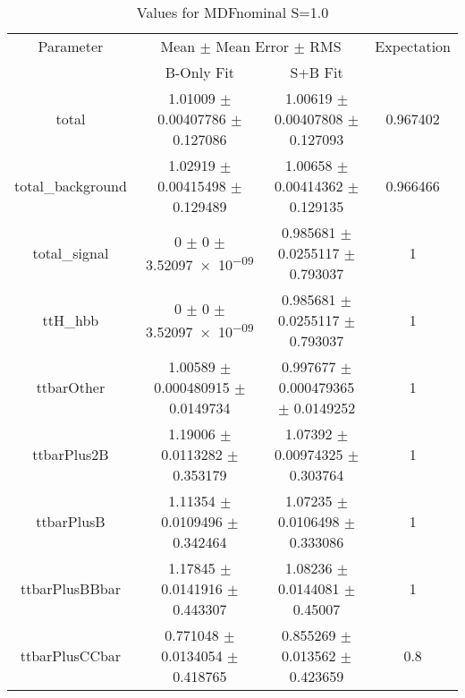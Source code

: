 \begin{table}
\centering
\caption{Values for MDFnominal S=1.0}
\begin{tabular}{cccc}
\toprule
Parameter & \multicolumn{2}{c}{Mean $\pm$ Mean Error $\pm$ RMS} & Expectation\\
 & B-Only Fit & S+B Fit & \\
\midrule
total & \num{1.01009} $\pm$ \num{0.00407786} $\pm$ \num{0.127086} & \num{1.00619} $\pm$ \num{0.00407808} $\pm$ \num{0.127093} & \num{0.967402}\\
total\_background & \num{1.02919} $\pm$ \num{0.00415498} $\pm$ \num{0.129489} & \num{1.00658} $\pm$ \num{0.00414362} $\pm$ \num{0.129135} & \num{0.966466}\\
total\_signal & \num{0} $\pm$ \num{0} $\pm$ \num{3.52097e-09} & \num{0.985681} $\pm$ \num{0.0255117} $\pm$ \num{0.793037} & \num{1}\\
ttH\_hbb & \num{0} $\pm$ \num{0} $\pm$ \num{3.52097e-09} & \num{0.985681} $\pm$ \num{0.0255117} $\pm$ \num{0.793037} & \num{1}\\
ttbarOther & \num{1.00589} $\pm$ \num{0.000480915} $\pm$ \num{0.0149734} & \num{0.997677} $\pm$ \num{0.000479365} $\pm$ \num{0.0149252} & \num{1}\\
ttbarPlus2B & \num{1.19006} $\pm$ \num{0.0113282} $\pm$ \num{0.353179} & \num{1.07392} $\pm$ \num{0.00974325} $\pm$ \num{0.303764} & \num{1}\\
ttbarPlusB & \num{1.11354} $\pm$ \num{0.0109496} $\pm$ \num{0.342464} & \num{1.07235} $\pm$ \num{0.0106498} $\pm$ \num{0.333086} & \num{1}\\
ttbarPlusBBbar & \num{1.17845} $\pm$ \num{0.0141916} $\pm$ \num{0.443307} & \num{1.08236} $\pm$ \num{0.0144081} $\pm$ \num{0.45007} & \num{1}\\
ttbarPlusCCbar & \num{0.771048} $\pm$ \num{0.0134054} $\pm$ \num{0.418765} & \num{0.855269} $\pm$ \num{0.013562} $\pm$ \num{0.423659} & \num{0.8}\\
\bottomrule
\end{tabular}
\end{table}